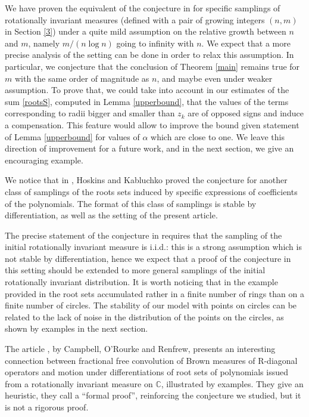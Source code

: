 \documentclass[11pt]{amsart}
\def\CC{{\mathbb{C}}}
\begin{document}
We have proven the equivalent of the conjecture in \cite{hoskins2021dynamics} for specific samplings of rotationally invariant measures (defined 
with a pair of growing integers $(n,m)$ in Section \ref{3}) under a quite mild assumption on the 
relative growth between $n$ and $m$, namely 
$m/(n \log n)$ going to infinity with $n$. We expect that a more precise analysis of the setting 
can be done in order to relax this assumption. 
In particular, we conjecture that the conclusion of Theorem \ref{main} remains true for $m$ with the same order of magnitude as $n$, and maybe even under weaker assumption.
To prove that, we could take into account in our estimates of the sum \eqref{rootsS}, computed in Lemma \ref{upperbound}, that the values of the 
terms  corresponding to radii bigger and smaller than $z_k$ are of opposed signs and induce a compensation. This feature would allow to improve the bound given statement of Lemma \ref{upperbound} for values of $\alpha$ which are close to one. We leave this direction of improvement for a future work, and in the next section, we give an encouraging example.

We notice that in \cite{hoskins2021dynamics}, Hoskins and Kabluchko proved the conjecture for another class of samplings of the roots sets induced by specific expressions of coefficients of the polynomials. The format of this class of samplings is stable by differentiation, as well as the setting of the present article. 

The precise statement of the conjecture in \cite{hoskins2021dynamics} requires that the sampling of the initial rotationally invariant measure is i.i.d.: this is a strong assumption which is not stable by differentiation, hence we expect that a proof of the conjecture in this setting should be extended to more general samplings of the initial rotationally invariant distribution. It is worth noticing that in the example provided in \cite{hoskins2021dynamics} the root sets accumulated rather in a finite number of rings than on a finite number of circles. The stability of our model with points on circles can be related to the lack of noise in the distribution of the points on the circles, as shown by examples in the next section.

The article \cite{campbell2024fractional}, by Campbell, O'Rourke and Renfrew, presents an
interesting connection between fractional free convolution of Brown measures of R-diagonal operators and motion under differentiations of root sets of polynomials issued from a rotationally invariant measure on $\CC$, illustrated by examples. They give an heuristic, they call a ``formal proof'', reinforcing the conjecture we studied, but it is not a rigorous proof.
\end{document}
